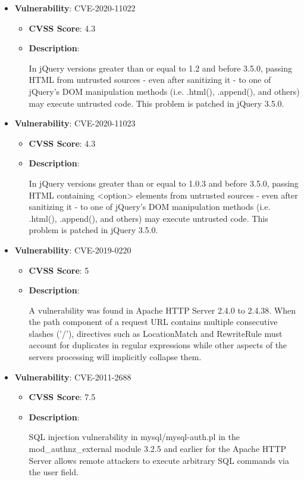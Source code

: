 \documentclass{article}
\begin{document}
\begin{itemize}
        \item \textbf{Vulnerability}: CVE-2020-11022
        \begin{itemize}
            \item \textbf{CVSS Score}:  4.3 
            \item \textbf{Description}:
            \parbox[t]{0.9\linewidth}{
                \ttfamily In jQuery versions greater than or equal to 1.2 and before 3.5.0, passing HTML from untrusted sources - even after sanitizing it - to one of jQuery's DOM manipulation methods (i.e. .html(), .append(), and others) may execute untrusted code. This problem is patched in jQuery 3.5.0.
            }
        \end{itemize}
    
        \item \textbf{Vulnerability}: CVE-2020-11023
        \begin{itemize}
            \item \textbf{CVSS Score}:  4.3 
            \item \textbf{Description}:
            \parbox[t]{0.9\linewidth}{
                \ttfamily In jQuery versions greater than or equal to 1.0.3 and before 3.5.0, passing HTML containing <option> elements from untrusted sources - even after sanitizing it - to one of jQuery's DOM manipulation methods (i.e. .html(), .append(), and others) may execute untrusted code. This problem is patched in jQuery 3.5.0.
            }
        \end{itemize}
    
        \item \textbf{Vulnerability}: CVE-2019-0220
        \begin{itemize}
            \item \textbf{CVSS Score}:  5 
            \item \textbf{Description}:
            \parbox[t]{0.9\linewidth}{
                \ttfamily A vulnerability was found in Apache HTTP Server 2.4.0 to 2.4.38. When the path component of a request URL contains multiple consecutive slashes ('/'), directives such as LocationMatch and RewriteRule must account for duplicates in regular expressions while other aspects of the servers processing will implicitly collapse them.
            }
        \end{itemize}
    
        \item \textbf{Vulnerability}: CVE-2011-2688
        \begin{itemize}
            \item \textbf{CVSS Score}:  7.5 
            \item \textbf{Description}:
            \parbox[t]{0.9\linewidth}{
                \ttfamily SQL injection vulnerability in mysql/mysql-auth.pl in the mod\_authnz\_external module 3.2.5 and earlier for the Apache HTTP Server allows remote attackers to execute arbitrary SQL commands via the user field.
            }
        \end{itemize}
    

\end{itemize}
\end{document}
